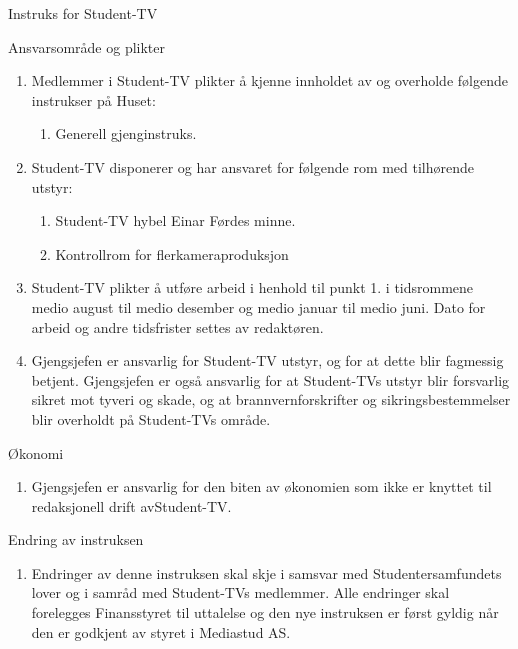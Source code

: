 \begin{instruks*}{Instruks for Student-TV}
    \begin{instruksledd}{Ansvarsområde og plikter}
        \begin{enumerate}   
            \item  Medlemmer i Student-TV plikter å kjenne innholdet av og overholde følgende
                instrukser på Huset:
                \begin{enumerate}
                    \item Generell gjenginstruks.
                \end{enumerate}
            \item Student-TV disponerer og har ansvaret for følgende rom med tilhørende utstyr:
                \begin{enumerate}
                    \item Student-TV hybel Einar Førdes minne.
                    \item Kontrollrom for flerkameraproduksjon
                \end{enumerate}
            \item Student-TV plikter å utføre arbeid i henhold til punkt 1. i tidsrommene
                medio august til medio desember og medio januar til medio juni. Dato for arbeid og andre tidsfrister
                settes av redaktøren.
            \item Gjengsjefen er ansvarlig for Student-TV utstyr, og for at dette blir fagmessig
                betjent. Gjengsjefen er også ansvarlig for at Student-TVs utstyr blir forsvarlig sikret mot tyveri
                og skade, og at brannvernforskrifter og sikringsbestemmelser blir overholdt på Student-TVs område.
        \end{enumerate}
    \end{instruksledd}

    \begin{instruksledd}{Økonomi}
        \begin{enumerate}
            \item Gjengsjefen er ansvarlig for den biten av økonomien som ikke er knyttet til
                redaksjonell drift avStudent-TV.
        \end{enumerate}
    \end{instruksledd}

    \begin{instruksledd}{Endring av instruksen}
        \begin{enumerate}
            \item Endringer av denne instruksen skal skje i samsvar med Studentersamfundets
                lover og i samråd med Student-TVs medlemmer. Alle endringer skal forelegges Finansstyret til
                uttalelse og den nye instruksen er først gyldig når den er godkjent av styret i Mediastud AS.
        \end{enumerate}
    \end{instruksledd}


\end{instruks*}
